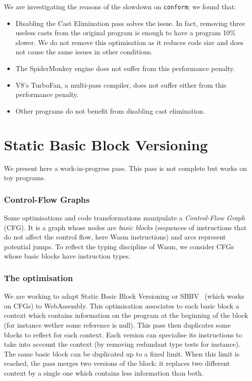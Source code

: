 \documentclass[a4paper,11pt]{article}
\begin{document}
We are investigating the reasons of the slowdown on \texttt{conform}; we found
that:
\begin{itemize}
  \item Disabling the Cast Elimination pass solves the issue. In fact, removing
    three useless casts from the original program is enough to have a program
    10\% slower. We do not remove this optimisation as it reduces code size and
    does not cause the same issues in other conditions.
  \item The SpiderMonkey engine does not suffer from this performance penalty.
  \item V8's TurboFan, a multi-pass compiler, does not suffer either from this
    performance penalty.
  \item Other programs do not benefit from disabling cast elimination.
\end{itemize}
\section{Static Basic Block Versioning}\label{sbbv}
We present here a work-in-progress pass. This pass is not complete but works on
toy programs.
\subsubsection{Control-Flow Graphs}\label{cfg}
Some optimisations and code transformations manipulate a \emph{Control-Flow
Graph} (CFG). It is a graph whose nodes are \emph{basic blocks} (sequences of
instructions that do not affect the control flow, here Wasm instructions) and
arcs represent potential jumps. To reflect the typing discipline of Wasm, we
consider CFGs whose basic blocks have instruction types.

\subsubsection{The optimisation}
We are working to adapt Static Basic Block Versioning or
SBBV~\cite{melanccon2024static} (which works on CFGs) to WebAssembly. This
optimisation associates to each basic block a context which contains information
on the program at the beginning of the block (for instance wether some reference
is null). This pass then duplicates some blocks to reflect for each context.
Each version can specialise its instructions to take into account the context
(by removing redundant type tests for instance). The same basic block can be
duplicated up to a fixed limit. When this limit is reached, the pass merges two
versions of the block: it replaces two different context by a single one which
contains less information than both.
\end{document}
